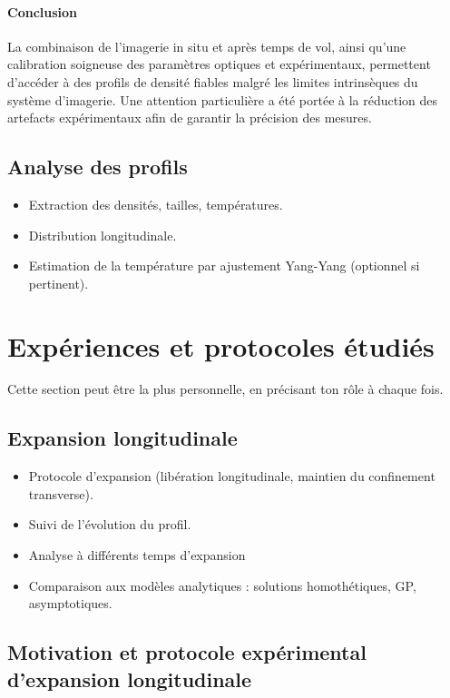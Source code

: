 \paragraph{Conclusion}

La combinaison de l’imagerie in situ et après temps de vol, ainsi qu’une calibration soigneuse des paramètres optiques et expérimentaux, permettent d’accéder à des profils de densité fiables malgré les limites intrinsèques du système d’imagerie. Une attention particulière a été portée à la réduction des artefacts expérimentaux afin de garantir la précision des mesures.


\subsection{Analyse des profils}

{\color{blue}
\begin{itemize}
    \item Extraction des densités, tailles, températures.
    \item Distribution longitudinale.
    \item Estimation de la température par ajustement Yang-Yang (optionnel si pertinent).
\end{itemize}
}


\section{Expériences et protocoles étudiés}
Cette section peut être la plus personnelle, en précisant ton rôle à chaque fois.
\subsection{Expansion longitudinale}
\begin{itemize}
    \item Protocole d’expansion (libération longitudinale, maintien du confinement transverse).
    \item Suivi de l’évolution du profil.
    \item Analyse à différents temps d’expansion
    \item Comparaison aux modèles analytiques : solutions homothétiques, GP, asymptotiques.
\end{itemize}

\subsection{Motivation et protocole expérimental d’expansion longitudinale}

